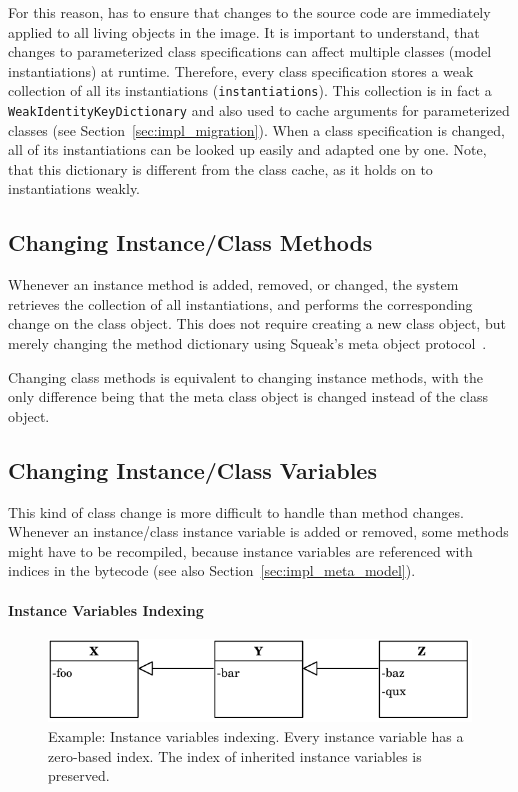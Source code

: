 For this reason, \msname has to ensure that changes to the source code are immediately applied to all living objects in the image. It is important to understand, that changes to parameterized class specifications can affect multiple classes (model instantiations) at runtime. Therefore, every class specification stores a weak collection of all its instantiations (\texttt{instantiations}). This collection is in fact a \texttt{WeakIdentityKeyDictionary} and also used to cache arguments for parameterized classes (see Section~\ref{sec:impl_migration}). When a class specification is changed, all of its instantiations can be looked up easily and adapted one by one. Note, that this dictionary is different from the class cache, as it holds on to instantiations weakly.

\subsection{Changing Instance/Class Methods}
Whenever an instance method is added, removed, or changed, the system retrieves the collection of all instantiations, and performs the corresponding change on the class object. This does not require creating a new class object, but merely changing the method dictionary using Squeak's meta object protocol~\cite{Goldberg:1983:SLI:273, Kiczales:1991:AMP:574212}.

Changing class methods is equivalent to changing instance methods, with the only difference being that the meta class object is changed instead of the class object.

\subsection{Changing Instance/Class Variables}
\label{sec:impl_ch_inst_cl_vars}
This kind of class change is more difficult to handle than method changes. Whenever an instance/class instance variable is added or removed, some methods might have to be recompiled, because instance variables are referenced with indices in the bytecode (see also Section~\ref{sec:impl_meta_model}). 

\paragraph{Instance Variables Indexing}
\begin{figure}[!htp]
	\centering
	\includegraphics[scale=1]{inst_vars.pdf}
	\caption[Example: Instance variables indexing]{Example: Instance variables indexing. Every instance variable has a zero-based index. The index of inherited instance variables is preserved.}
	\label{fig:impl_inst_vars}
\end{figure}

